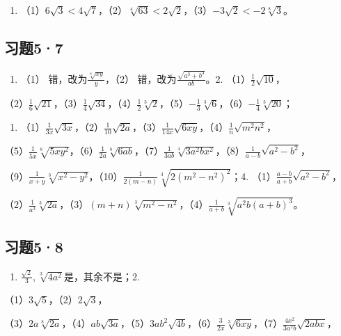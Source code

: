 \begin{enumerate}[start=4]
\item
  （1）\(6\sqrt{3} < 4\sqrt{7}\)，（2）\(\sqrt[4]{63} < 2\sqrt{2}\)，（3）\(-3\sqrt{2} < -2\sqrt[8]{3}\)。
\end{enumerate}

\subsection{习题5·7}

\begin{enumerate}
\item
  （1） 错，改为\(\frac{\sqrt[8]{xy}}{y}\)，（2）
  错，改为\(\frac{\sqrt{a^3 + b^3}}{ab}\)。2.
  （1）\(\frac{1}{2}\sqrt{10}\)，
\end{enumerate}

（2）\(\frac{1}{6}\sqrt{21}\)，（3）\(\frac{1}{4}\sqrt{34}\)，（4）\(\frac{1}{2}\sqrt[3]{2}\)，（5）\(-\frac{1}{3}\sqrt[3]{6}\)，（6）\(-\frac{1}{4}\sqrt[3]{20}\)；

\begin{enumerate}[start=3]
\item
  （1）\(\frac{1}{3x}\sqrt{3x}\)，（2）\(\frac{1}{10}\sqrt{2a}\)，（3）\(\frac{1}{14x}\sqrt{6xy}\)，（4）\(\frac{1}{n}\sqrt{m^2n^2}\)，
\end{enumerate}

（5）\(\frac{1}{5x}\sqrt[8]{5xy^2}\)，（6）\(\frac{1}{2a}\sqrt[8]{6ab}\)，（7）\(\frac{1}{3ab}\sqrt[4]{3a^2b x^2}\)，（8）\(\frac{1}{a-b}\sqrt{a^2-b^2}\)，

（9）\(\frac{1}{x + y}\sqrt[3]{x^2 - y^2}\)，（10）\(\frac{1}{2(m - n)}\sqrt[3]{2(m^2 - n^2)^2}\)；4.
（1）\(\frac{a - b}{a + b}\sqrt{a^2 - b^2}\)，

（2）\(\frac{1}{a^3}\sqrt[3]{2a}\)，（3）\((m + n)\sqrt[3]{m^2 - n^2}\)，（4）\(\frac{1}{a + b}\sqrt[3]{a^2b(a + b)^3}\)。

\subsection{习题5·8}

\begin{enumerate}[start=1]
\item
  \(\frac{\sqrt{2}}{3}, \sqrt[3]{4a^2}\)是，其余不是；2.
\end{enumerate}
（1）\(3\sqrt{5}\)，（2）\(2\sqrt{3}\)，

（3）\(2a\sqrt[8]{2a}\)，（4）\(ab\sqrt{3a}\)，（5）\(3ab^{2}\sqrt{4b}\)，（6）\(\frac{3}{2x}\sqrt[3]{6xy}\)，（7）\(\frac{4x^2}{3a^2b}\sqrt{2abx}\)，


